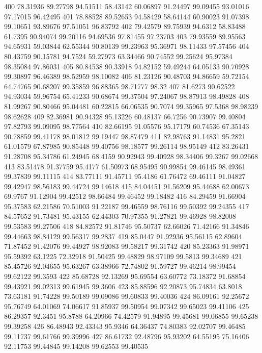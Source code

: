 400	78.31936	89.27798	94.51511	58.43142	60.06897	91.24497	99.09455	93.01016	97.17015	96.42495
401	78.88528	89.52653	94.58429	58.64144	60.90023	91.07398	99.10651	93.89676	97.51051	96.83792
402	79.42579	89.75939	94.6312	58.83488	61.7395	90.94074	99.20116	94.69536	97.81455	97.23703
403	79.93559	89.95563	94.65931	59.03844	62.55344	90.80139	99.23963	95.36971	98.11433	97.57456
404	80.43759	90.15781	94.7524	59.27973	63.34466	90.74552	99.25624	95.97384	98.35084	97.86031
405	80.84538	90.33918	94.82152	59.49244	64.05133	90.70928	99.30897	96.46389	98.52959	98.10082
406	81.23126	90.48703	94.86659	59.72154	64.74765	90.68207	99.35859	96.88365	98.71777	98.32
407	81.6273	90.62522	94.93034	59.96754	65.41233	90.68674	99.37504	97.24067	98.87913	98.49828
408	81.99267	90.80466	95.04481	60.22815	66.06535	90.7074	99.35965	97.5368	98.98239	98.62628
409	82.36981	90.94328	95.13226	60.48137	66.7256	90.73907	99.40804	97.82793	99.09095	98.77564
410	82.66195	91.05576	95.17179	60.74536	67.35143	90.78859	99.41178	98.01812	99.19447	98.87479
411	82.98763	91.14831	95.2821	61.01579	67.87985	90.85448	99.40756	98.18577	99.26114	98.95149
412	83.26431	91.28708	95.34786	61.24945	68.4159	90.92943	99.40928	98.34406	99.3267	99.02668
413	83.51478	91.37759	95.4177	61.50973	68.95495	90.99854	99.46145	98.49361	99.37839	99.11115
414	83.77111	91.45711	95.4186	61.76472	69.46111	91.04827	99.42947	98.56183	99.44724	99.14618
415	84.04451	91.56209	95.44688	62.00673	69.9767	91.12904	99.42512	98.66484	99.46452	99.18482
416	84.29459	91.66904	95.37583	62.21586	70.51003	91.22187	99.46559	98.76116	99.50392	99.24355
417	84.57652	91.73481	95.43155	62.44303	70.97355	91.27821	99.46928	98.82008	99.53583	99.27506
418	84.82572	91.81746	95.50737	62.66026	71.42166	91.34846	99.44663	98.84129	99.56317	99.2837
419	85.0447	91.92936	95.56115	62.89604	71.87452	91.42076	99.44927	98.92083	99.58217	99.31742
420	85.23363	91.98971	95.59392	63.1225	72.32918	91.50425	99.48829	98.97109	99.5813	99.34689
421	85.45726	92.04655	95.63267	63.38966	72.74802	91.59727	99.46214	98.99454	99.62122	99.3593
422	85.68728	92.13269	95.69554	63.60772	73.18372	91.68854	99.43921	99.02313	99.61945	99.3606
423	85.88596	92.20873	95.74834	63.8018	73.63181	91.74228	99.50189	99.09086	99.60833	99.40036
424	86.09161	92.25672	95.76749	64.01069	74.06617	91.85937	99.50954	99.07342	99.65023	99.41106
425	86.29357	92.3451	95.8788	64.20966	74.42579	91.94895	99.45681	99.06855	99.65238	99.39258
426	86.48943	92.43343	95.9346	64.36437	74.80383	92.02707	99.46485	99.11737	99.61766	99.39996
427	86.61732	92.48796	95.93202	64.55195	75.16406	92.11753	99.44845	99.14208	99.62553	99.40535
